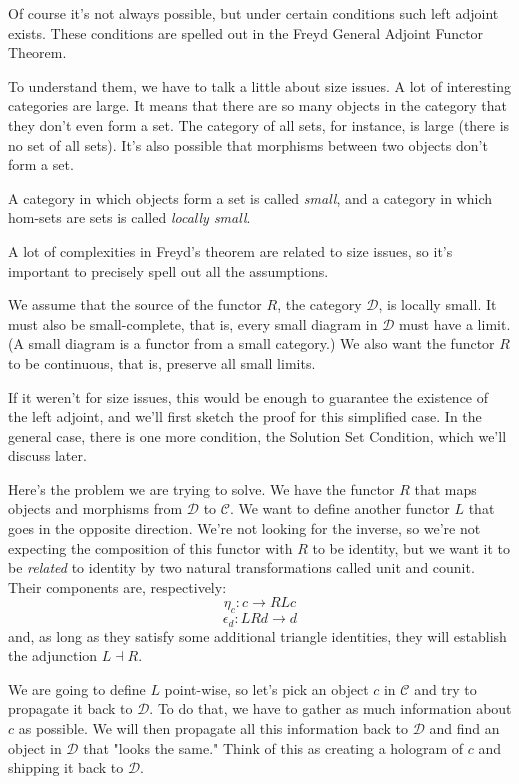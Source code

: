 \documentclass[11pt]{amsart}
\begin{document}
Of course it's not always possible, but under certain conditions such left adjoint exists. These conditions are spelled out in the Freyd General Adjoint Functor Theorem. 

To understand them, we have to talk a little about size issues. A lot of interesting categories are large. It means that there are so many objects in the category that they don't even form a set. The category of all sets, for instance, is large (there is no set of all sets). It's also possible that morphisms between two objects don't form a set. 

A category in which objects form a set is called \emph{small}, and a category in which hom-sets are sets is called \emph{locally small}. 

A lot of complexities in Freyd's theorem are related to size issues, so it's important to precisely spell out all the assumptions.

We assume that the source of the functor $R$, the category $\mathcal D$, is locally small. It must also be small-complete, that is, every small diagram in $\mathcal D$ must have a limit. (A small diagram is a functor from a small category.) We also want the functor $R$ to be continuous, that is, preserve all small limits. 

If it weren't for size issues, this would be enough to guarantee the existence of the left adjoint, and we'll first sketch the proof for this simplified case. In the general case, there is one more condition, the Solution Set Condition, which we'll discuss later.

Here's the problem we are trying to solve. We have the functor $R$ that maps objects and morphisms from $\mathcal D$ to $\mathcal C$. We want to define another functor $L$ that goes in the opposite direction. We're not looking for the inverse, so we're not expecting the composition of this functor with $R$ to be identity, but we want it to be \emph{related} to identity by two natural transformations called unit and counit. Their components are, respectively:
\[ \eta_c : c \to R L c\]
\[\epsilon_d : L R d \to d \]
and, as long as they satisfy some additional triangle identities, they will establish the adjunction $L \dashv R$.

We are going to define $L$ point-wise, so let's pick an object $c$ in $\mathcal C$ and try to propagate it back to $\mathcal D$. To do that, we have to gather as much information about $c$ as possible. We will then propagate all this information back to $\mathcal D$ and find an object in $\mathcal D$ that "looks the same." Think of this as creating a hologram of $c$ and shipping it back to $\mathcal D$. 
\end{document}

